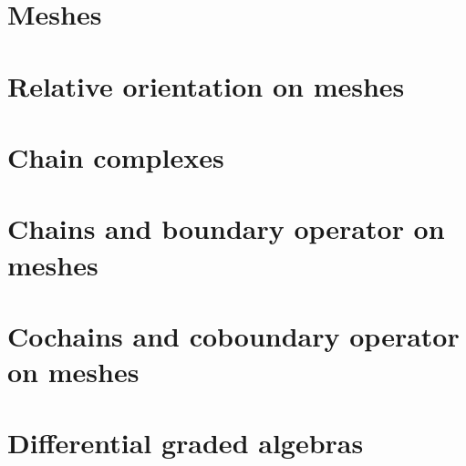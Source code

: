 \documentclass{article}
\theoremstyle{definition}
\begin{document}
\section{Meshes}
\label{section:meshes}


\section{Relative orientation on meshes}
\label{section:relative_orientation_on_meshes}





\section{Chain complexes}
\label{section:chain_complexes}




\section{Chains and boundary operator on meshes}
\label{section:chains_and_boundary_operator_on_meshes}








\section{Cochains and coboundary operator on meshes}
\label{section:cochains_and_coboundary_operator_on_meshes}





\section{Differential graded algebras}
\label{section:differential_graded_algebras}



\end{document}
